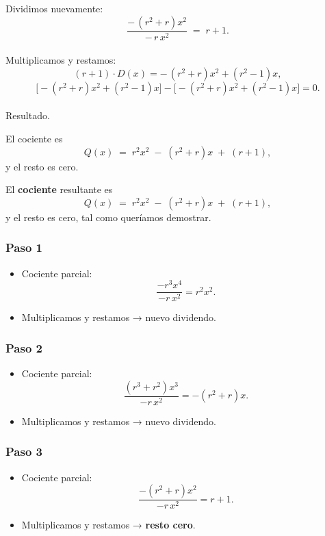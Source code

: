 \documentclass[
  10pt,
  a4paper,
  DIV=11,
  numbers=noendperiod,
  open=any]{scrreprt}
\makeatletter
\let\oldparagraph\paragraph
\renewcommand{\paragraph}{
    \@ifstar
      \xxxParagraphStar
      \xxxParagraphNoStar
  }
\newcommand{\xxxParagraphStar}[1]{\oldparagraph*{#1}\mbox{}}
\newcommand{\xxxParagraphNoStar}[1]{\oldparagraph{#1}\mbox{}}
\providecommand{\tightlist}{%
  \setlength{\itemsep}{0pt}\setlength{\parskip}{0pt}}
\numberwithin{equation}{chapter}
\numberwithin{equation}{chapter}
\renewcommand{\[}{\begin{equation}}
\renewcommand{\]}{\end{equation}}
\makeatother
\begin{document}
Dividimos nuevamente: \[
\frac{-\,(r^2+r)x^2}{-\,r\,x^2}
\;=\;
r+1.
\]\\
Multiplicamos y restamos: \[
(r+1)\cdot D(x)
= -\,(r^2+r)x^2 + (r^2-1)x,
\] \[
\bigl[-(r^2+r)x^2 + (r^2-1)x\bigr]
-
\bigl[-(r^2+r)x^2 + (r^2-1)x\bigr]
= 0.
\]

\paragraph{Resultado.}

El cociente es \[
Q(x) \;=\; r^2x^2 \;-\;(r^2+r)x \;+\;(r+1),
\] y el resto es cero.

El \textbf{cociente} resultante es \[
Q(x) \;=\; r^2x^2 \;-\;(r^2+r)x \;+\;(r+1),
\] y el resto es cero, tal como queríamos demostrar.

\subsubsection{Paso 1}\label{paso-1}

\begin{itemize}
\tightlist
\item
  Cociente parcial:\\
  \[
  \frac{-r^3x^4}{-r\,x^2} = r^2x^2.
  \]
\item
  Multiplicamos y restamos → nuevo dividendo.
\end{itemize}

\subsubsection{Paso 2}\label{paso-2}

\begin{itemize}
\tightlist
\item
  Cociente parcial:\\
  \[
  \frac{(r^3+r^2)x^3}{-r\,x^2} = -(r^2+r)x.
  \]
\item
  Multiplicamos y restamos → nuevo dividendo.
\end{itemize}

\subsubsection{Paso 3}\label{paso-3}

\begin{itemize}
\tightlist
\item
  Cociente parcial:\\
  \[
  \frac{-(r^2+r)x^2}{-r\,x^2} = r+1.
  \]
\item
  Multiplicamos y restamos → \textbf{resto cero}.
\end{itemize}
\end{document}
